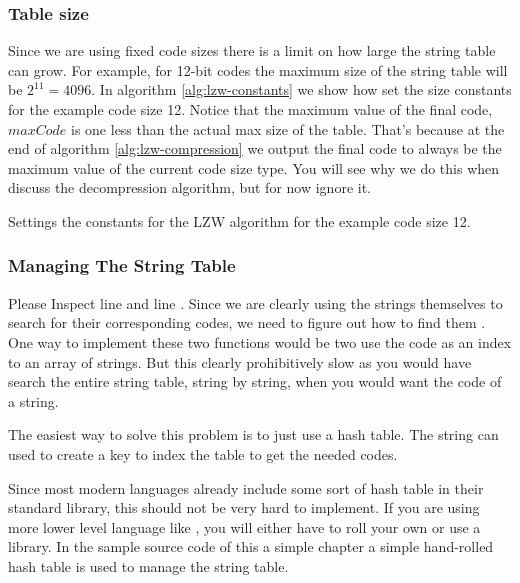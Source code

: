 \begin{refsection}
\subsubsection{Table size}

Since we are using fixed code sizes there is a limit on how large the
string table can grow. For example, for 12-bit codes the maximum size
of the string table will be $2^{11}=4096$. In algorithm
\ref{alg:lzw-constants} we show how set the size constants for the
example code size 12. Notice that the maximum value of the final code,
$maxCode$ is one less than the actual max size of the table. That's
because at the end of algorithm \ref{alg:lzw-compression} we output
the final code to always be the maximum value of the current code size
type. You will see why we do this when discuss the decompression
algorithm, but for now ignore it.

\begin{algorithm}[H]
  \caption{Settings the constants for the LZW algorithm for the
    example code size 12.}
  \label{alg:lzw-constants}
  \begin{algorithmic}[1]
  \end{algorithmic}
\end{algorithm}

\subsubsection{Managing The String Table}

Please Inspect line
 and line
. Since we are clearly
using the strings themselves to search for their corresponding codes,
we need to figure out how to find them . One way to implement these
two functions would be two use the code as an index to an array of
strings. But this clearly prohibitively slow as you would have
search the entire string table, string by string, when you would want
the code of a string.

The easiest way to solve this problem is to just use a hash table. The
string can used to create a key to index the table to get the needed
codes.

Since most modern languages already include some sort of hash table in
their standard library, this should not be very hard to implement. If you
are using more lower level language like \C, you will either have
to roll your own or use a library. In the sample \C source code of
this a simple chapter a simple hand-rolled hash table is used to
manage the string table.


\end{refsection}
